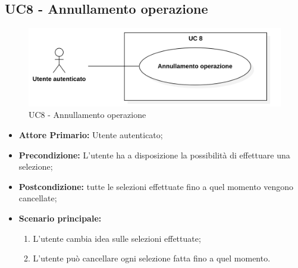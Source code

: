 \subsection{UC8 - Annullamento operazione}
\begin{figure}[H]
    \centering
    \includegraphics[scale = 0.7]{components/img/UC8.png}
    \caption{UC8 - Annullamento operazione}
\end{figure}
\begin{itemize}
\item \textbf{Attore Primario:} Utente autenticato;
\item \textbf{Precondizione:} L'utente ha a disposizione la possibilità di effettuare una selezione;
\item \textbf{Postcondizione:} tutte le selezioni effettuate fino a quel momento vengono cancellate;
\item \textbf{Scenario principale:}
    \begin{enumerate}
    \item L'utente cambia idea sulle selezioni effettuate;
    \item L'utente può cancellare ogni selezione fatta fino a quel momento.
    \end{enumerate}
\end{itemize}